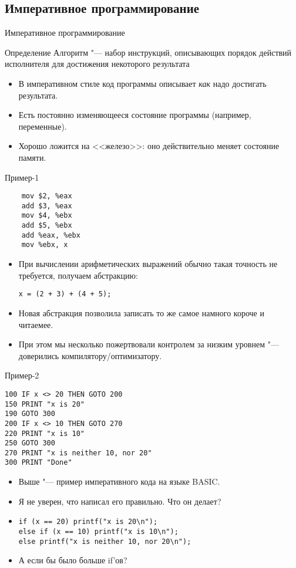\subsection{Императивное программирование}
\begin{frame}{Императивное программирование}
	\begin{exampleblock}{Определение}
		Алгоритм "--- набор инструкций, описывающих порядок действий исполнителя для достижения некоторого результата
	\end{exampleblock}
	\begin{itemize}
		\item В императивном стиле код программы описывает \textit{как} надо достигать результата.
		\item Есть постоянно изменяющееся состояние программы (например, переменные).
		\item Хорошо ложится на <<железо>>: оно действительно меняет состояние памяти.
	\end{itemize}
\end{frame}

\begin{frame}[fragile]{Пример-1}
\begin{verbatim}
	mov $2, %eax
	add $3, %eax
	mov $4, %ebx
	add $5, %ebx
	add %eax, %ebx
	mov %ebx, x
\end{verbatim}
	\begin{itemize}
		\item При вычислении арифметических выражений обычно такая точность не требуется, получаем абстракцию:
\begin{verbatim}
x = (2 + 3) + (4 + 5);
\end{verbatim}
		\item Новая абстракция позволила записать то же самое намного короче и читаемее.
		\item При этом мы несколько пожертвовали контролем за низким уровнем "--- доверились компилятору/оптимизатору.
	\end{itemize}
\end{frame}

\begin{frame}[fragile]{Пример-2}
\begin{verbatim}
100 IF x <> 20 THEN GOTO 200
150 PRINT "x is 20"
190 GOTO 300
200 IF x <> 10 THEN GOTO 270
220 PRINT "x is 10"
250 GOTO 300
270 PRINT "x is neither 10, nor 20"
300 PRINT "Done"
\end{verbatim}
	\begin{itemize}
		\item Выше "--- пример императивного кода на языке BASIC.
		\item Я не уверен, что написал его правильно. Что он делает?\pause
		\item
\begin{verbatim}
if (x == 20) printf("x is 20\n");
else if (x == 10) printf("x is 10\n");
else printf("x is neither 10, nor 20\n");
\end{verbatim}
		\item А если бы было больше if'ов?
	\end{itemize}
\end{frame}

